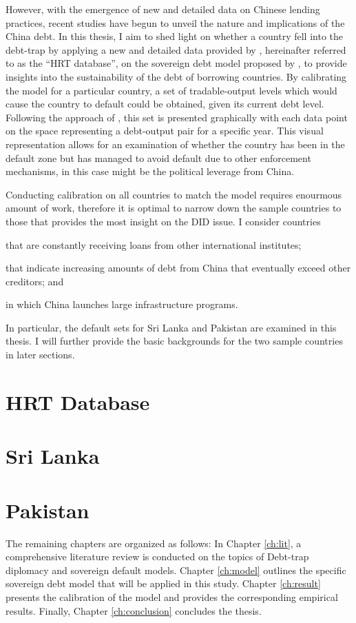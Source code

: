 However, with the emergence of new and detailed data on Chinese lending practices, recent studies have begun to unveil the nature and implications of the China debt.
In this thesis, I aim to shed light on whether a country fell into the debt-trap by applying a new and detailed data provided by \citet*{Horn-Reinhart-Trebesch-21}, hereinafter referred to as the ``HRT database'', on the sovereign debt model proposed by \citet*{Na-18}, to provide insights into the sustainability of the debt of borrowing countries.
By calibrating the model for a particular country, a set of tradable-output levels which would cause the country to default could be obtained, given its current debt level. Following the approach of \citet{Hinrichsen_2020-chapter4}, this set is presented graphically with each data point on the space representing a debt-output pair for a specific year. This visual representation allows for an examination of whether the country has been in the default zone but has managed to avoid default due to other enforcement mechanisms, in this case might be the political leverage from China.

Conducting calibration on all countries to match the model requires enourmous amount of work, therefore it is optimal to narrow down the sample countries to those that provides the most insight on the DID issue. I consider countries
\begin{enumerate*}[label = (\roman*)]
    \item that are constantly receiving loans from other international institutes;
    \item that indicate increasing amounts of debt from China that eventually exceed other creditors; and
    \item in which China launches large infrastructure programs.
\end{enumerate*}
In particular, the default sets for Sri Lanka and Pakistan are examined in this thesis. I will further provide the basic backgrounds for the two sample countries in later sections.

\section*{HRT Database}


\section*{Sri Lanka}

\section*{Pakistan}


The remaining chapters are organized as follows:
In Chapter \ref{ch:lit}, a comprehensive literature review is conducted on the topics of Debt-trap diplomacy and sovereign default models.
Chapter \ref{ch:model} outlines the specific sovereign debt model that will be applied in this study.
Chapter \ref{ch:result} presents the calibration of the model and provides the corresponding empirical results.
Finally, Chapter \ref{ch:conclusion} concludes the thesis.
